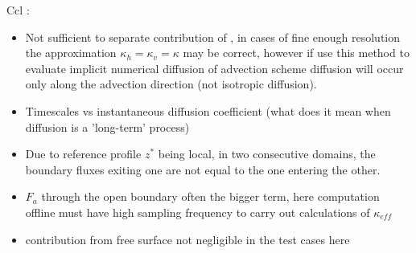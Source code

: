 Ccl :
\begin{itemize}
\item Not sufficient to separate contribution of , in cases of fine enough resolution the approximation $\kappa_h=\kappa_v=\kappa$ may be correct, however if use this method to evaluate implicit numerical diffusion of advection scheme diffusion will occur only along the advection direction (not isotropic diffusion).
\item Timescales vs instantaneous diffusion coefficient (what does it mean when diffusion is a 'long-term' process)
\item Due to reference profile $z^*$ being local, in two consecutive domains, the boundary fluxes exiting one are not equal to the one entering the other. 
\item $F_a$ through the open boundary often the bigger term, here computation offline must have high sampling frequency to carry out calculations of $\kappa_{eff}$
\item contribution from free surface not negligible in the test cases here
\end{itemize}




